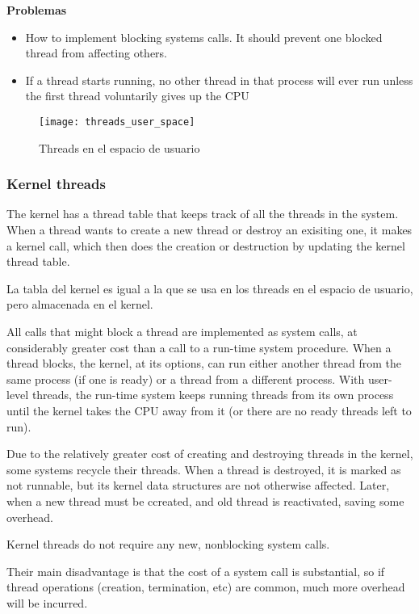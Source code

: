 \documentclass[a4paper, twoside]{article}
\begin{document}
\textbf{Problemas}
\begin{itemize}
	\item How to implement blocking systems calls. It should prevent one blocked thread from affecting others.
	\item If a thread starts running, no other thread in that process will ever run unless the first thread voluntarily gives up the CPU
\end{itemize}

\begin{figure}[h]
	\centering
	\texttt{[image: threads\_user\_space]}
	\caption{Threads en el espacio de usuario}
	\label{fig:threads_user_space}
\end{figure}

\subsubsection{Kernel threads}
The kernel has a thread table that keeps track of all the threads in the system. When a thread wants to create a new thread or destroy an exisiting one, it makes a kernel call, which then does the creation or destruction by updating the kernel thread table.

La tabla del kernel es igual a la que se usa en los threads en el espacio de usuario, pero almacenada en el kernel.

All calls that might block a thread are implemented as system calls, at considerably greater cost than a call to a run-time system procedure. When a thread blocks, the kernel, at its options, can run either another thread from the same process (if one is ready) or a thread from a different process. With user-level threads, the run-time system keeps running threads from its own process until the kernel takes the CPU away from it (or there are no ready threads left to run).

Due to the relatively greater cost of creating and destroying threads in the kernel, some systems recycle their threads. When a thread is destroyed, it is marked as not runnable, but its kernel data structures are not otherwise affected. Later, when a new thread must be ccreated, and old thread is reactivated, saving some overhead.

Kernel threads do not require any new, nonblocking system calls.

Their main disadvantage is that the cost of a system call is substantial, so if thread operations (creation, termination, etc) are common, much more overhead will be incurred.\\
\end{document}
